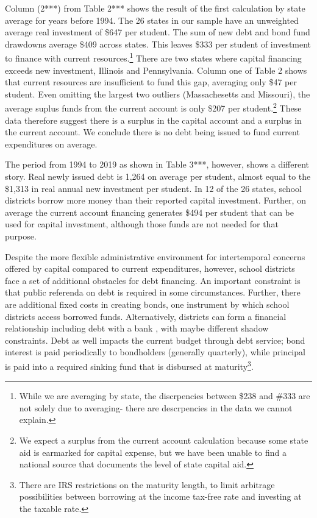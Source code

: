 Column (2***) from Table 2*** shows the result of the first calculation by state average for years before 1994.  The 26 states in our sample have an unweighted average real investment of \$647 per student.  The sum of new debt and bond fund drawdowns average \$409 across states.  This leaves \$333 per student of investment to finance with current resources.\footnote{While we are averaging by state, the discrpencies between \$238 and \#333 are not solely due to averaging- there are descrpencies in the data we cannot explain.}  There are two states where capital financing exceeds new investment, Illinois and Pennsylvania.  Column one of Table 2 shows that current resources are insufficient to fund this gap, averaging only \$47 per student.  Even omitting the largest two outliers (Massachesetts and Missouri), the average suplus funds from the current account is only \$207 per student.\footnote{We expect a surplus from the current account calculation because some state aid is earmarked for capital expense, but we have been unable to find a national source that documents the level of state capital aid.}  These data therefore suggest there is a surplus in the capital account and a surplus in the current account.  We conclude there is no debt being issued to fund current expenditures on average.

The period from 1994 to 2019 as shown in Table 3***, however, shows a different story.  Real newly issued debt is \@1,264 on average per student, almost equal to the \$1,313 in real annual new investment per student.  In 12 of the 26 states, school districts borrow more money than their reported capital investment.  Further, on average the current account financing generates \$494 per student that can be used for capital investment, although those funds are not needed for that purpose.  





Despite the more flexible administrative environment for intertemporal concerns offered by capital compared to current expenditures, however, school districts face a set of additional obstacles for debt financing. An important constraint is that public referenda on debt is required in some circumstances. Further, there are additional fixed costs in creating bonds, one instrument by which school districts access borrowed funds. Alternatively, districts can form a financial relationship including debt with a bank \autocite{ivanov_limits_2024}, with maybe different shadow constraints. Debt as well impacts the current budget through debt service; bond interest is paid periodically to bondholders (generally quarterly), while principal is paid into a required sinking fund that is disbursed at maturity\footnote{There are IRS restrictions on the maturity length, to limit arbitrage possibilities between borrowing at the income tax-free rate and investing at the taxable rate.}.

